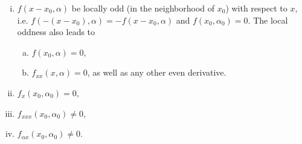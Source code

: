 \begin{enumerate}[(i)]
	\item $f(x-x_0,\alpha)$ be locally odd (in the neighborhood of $x_0$) with respect to $x$, i.e. $f(-(x-x_0),\alpha) = - f(x-x_0,\alpha)$ and $f(x_0,\alpha_0) =0 $. The local oddness also leads to 
	\begin{enumerate}[(a)]
		\item $f(x_0,\alpha) = 0$,
		\item $f_{xx}(x,\alpha)=0$, as well as any other even derivative.
	\end{enumerate} 
	\item $f_x(x_0,\alpha_0) =0$,
	\item $f_{xxx}(x_0,\alpha_0) \neq 0$,
	\item $f_{\alpha x} (x_0,\alpha_0) \neq 0$.
\end{enumerate}

